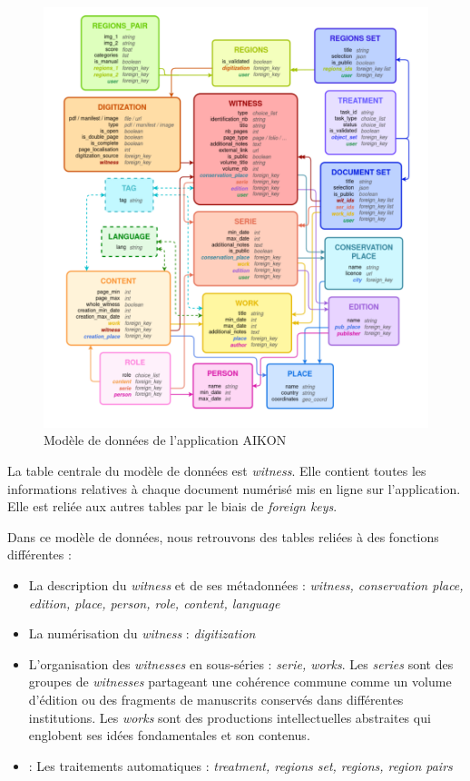 \begin{figure}[H]
	\centering
	\includegraphics[width=1\textwidth]{images/modele_donnees_aikon.png}
	\caption{Modèle de données de l'application AIKON}
	\label{fig:modele_donnees}
\end{figure}

La table centrale du modèle de données est \textit{witness}. Elle contient toutes les informations relatives à chaque document numérisé mis en ligne sur l'application. Elle est reliée aux autres tables par le biais de \textit{foreign keys}. 

Dans ce modèle de données, nous retrouvons des tables reliées à des fonctions différentes : 
\begin{itemize}
	\item La description du \textit{witness} et de ses métadonnées : \textit{witness, conservation place, edition, place, person, role, content, language}
	\item La numérisation du \textit{witness} : \textit{digitization}
	\item L'organisation des \textit{witnesses} en sous-séries : \textit{serie, works}. Les \textit{series} sont des groupes de \textit{witnesses} partageant une cohérence commune comme un volume d'édition ou des fragments de manuscrits conservés dans différentes institutions. Les \textit{works} sont des productions intellectuelles abstraites qui englobent ses idées fondamentales et son contenus. 
	\item : Les traitements automatiques : \textit{treatment, regions set, regions, region pairs} 
\end{itemize}

